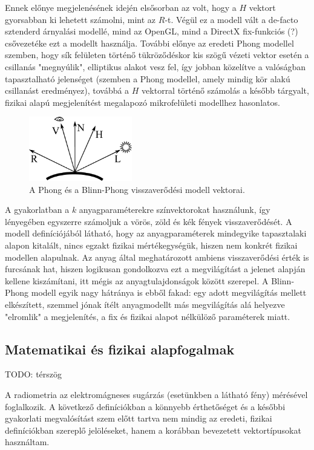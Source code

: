 Ennek előnye megjelenésének idején elsősorban az volt, hogy a \(H\) vektort gyorsabban ki lehetett számolni, mint az \(R\)-t. Végül ez a modell vált a de-facto sztenderd árnyalási modellé, mind az OpenGL, mind a DirectX fix-funkciós (?) csővezetéke ezt a modellt használja. További előnye az eredeti Phong modellel szemben, hogy sík felületen történő tükröződéskor kis szögű vézeti vektor esetén a csillanás "megnyúlik", elliptikus alakot vesz fel, így jobban közelítve a valóságban tapasztalható jelenséget (szemben a Phong modellel, amely mindig kör alakú csillanást eredményez), továbbá a \(H\) vektorral történő számolás a később tárgyalt, fizikai alapú megjelenítést megalapozó mikrofelületi modellhez hasonlatos.

\begin{figure}[!ht]
    \centering
    \includegraphics[width=0.4\textwidth]{images/blinn_vectors.eps}
    \caption{A Phong és a Blinn-Phong visszaverődési modell vektorai.}
\end{figure}

A gyakorlatban a \(k\) anyagparaméterekre színvektorokat használunk, így lényegében egyszerre számoljuk a vörös, zöld és kék fények visszaverődését. A modell definíciójából látható, hogy az anyagparaméterek mindegyike tapasztalaki alapon kitalált, nincs egzakt fizikai mértékegységük, hiszen nem konkrét fizikai modellen alapulnak. Az anyag által meghatározott ambiens visszaverődési érték is furcsának hat, hiszen logikusan gondolkozva ezt a megvilágítást a jelenet alapján kellene kiszámítani, itt mégis az anyagtulajdonságok között szerepel. A Blinn-Phong modell egyik nagy hátránya is ebből fakad: egy adott megvilágítás mellett elkészített, szemmel jónak ítélt anyagmodellt más megvilágítás alá helyezve "elromlik" a megjelenítés, a fix és fizikai alapot nélkülöző paraméterek miatt.

\subsection{Matematikai és fizikai alapfogalmak}
\label{subsec:matbase}

TODO: térszög

A radiometria az elektromágneses sugárzás (esetünkben a látható fény) mérésével foglalkozik. A következő definíciókban a könnyebb érthetőséget és a későbbi gyakorlati megvalósítást szem előtt tartva nem mindig az eredeti, fizikai definíciókban szereplő jelöléseket, hanem a korábban bevezetett vektortípusokat használtam.

